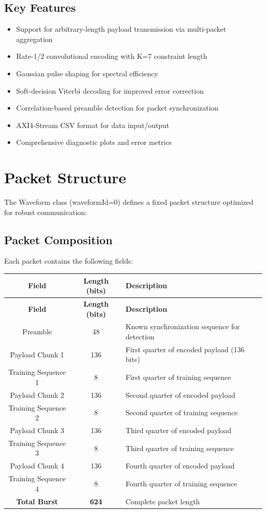 \documentclass[12pt]{article}
\begin{document}
\subsection{Key Features}
\begin{itemize}
    \item Support for arbitrary-length payload transmission via multi-packet aggregation
    \item Rate-1/2 convolutional encoding with K=7 constraint length
    \item Gaussian pulse shaping for spectral efficiency
    \item Soft-decision Viterbi decoding for improved error correction
    \item Correlation-based preamble detection for packet synchronization
    \item AXI4-Stream CSV format for data input/output
    \item Comprehensive diagnostic plots and error metrics
\end{itemize}

\section{Packet Structure}

The Waveform class (waveformId=0) defines a fixed packet structure optimized for robust communication:

\subsection{Packet Composition}
Each packet contains the following fields:

\begin{longtable}{|c|c|p{8cm}|}
\hline
\textbf{Field} & \textbf{Length (bits)} & \textbf{Description} \\
\hline
\endfirsthead
\hline
\textbf{Field} & \textbf{Length (bits)} & \textbf{Description} \\
\hline
\endhead
\hline
\endfoot
\hline
Preamble & 48 & Known synchronization sequence for detection \\
\hline
Payload Chunk 1 & 136 & First quarter of encoded payload (136 bits) \\
\hline
Training Sequence 1 & 8 & First quarter of training sequence \\
\hline
Payload Chunk 2 & 136 & Second quarter of encoded payload \\
\hline
Training Sequence 2 & 8 & Second quarter of training sequence \\
\hline
Payload Chunk 3 & 136 & Third quarter of encoded payload \\
\hline
Training Sequence 3 & 8 & Third quarter of training sequence \\
\hline
Payload Chunk 4 & 136 & Fourth quarter of encoded payload \\
\hline
Training Sequence 4 & 8 & Fourth quarter of training sequence \\
\hline
\textbf{Total Burst} & \textbf{624} & Complete packet length \\
\hline
\end{longtable}
\end{document}
